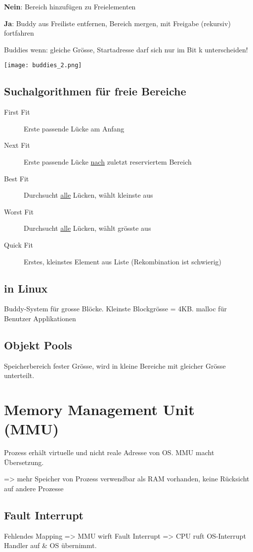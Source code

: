 \begin{multicols*}{4}
\textbf{Nein}: Bereich hinzufügen zu Freielementen

\textbf{Ja}: Buddy aus Freiliste entfernen, Bereich mergen, mit Freigabe (rekursiv) fortfahren

Buddies wenn: gleiche Grösse, Startadresse darf sich nur im Bit k unterscheiden!

\hfill\texttt{[image: buddies\_2.png]}

\subsection{Suchalgorithmen für freie Bereiche}
\begin{description}
    \item[First Fit] Erste passende Lücke am Anfang
    \item[Next Fit] Erste passende Lücke \underline{nach} zuletzt reserviertem Bereich
    \item[Best Fit] Durchsucht \underline{alle} Lücken, wählt kleinste aus
    \item[Worst Fit] Durchsucht \underline{alle} Lücken, wählt grösste aus
    \item[Quick Fit] Erstes, kleinstes Element aus Liste
    (Rekombination ist schwierig)
\end{description}

\subsection{in Linux}
Buddy-System für grosse Blöcke. Kleinste Blockgrösse = 4KB. malloc für Benutzer Applikationen

\subsection{Objekt Pools}
Speicherbereich fester Grösse, wird in kleine Bereiche mit gleicher Grösse unterteilt.

\section{Memory Management Unit (MMU)}
Prozess erhält virtuelle und nicht reale Adresse von OS. MMU macht Übersetzung.

=> mehr Speicher von Prozess verwendbar als RAM vorhanden, keine Rücksicht auf andere Prozesse

\subsection{Fault Interrupt}
Fehlendes Mapping => MMU wirft Fault Interrupt => CPU ruft OS-Interrupt Handler auf \& OS übernimmt.\vspace{2pt}


\end{multicols*}
